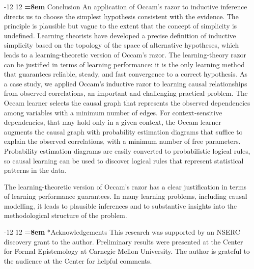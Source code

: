 \documentclass{elsarticle}%
\makeatletter
\renewcommand\section{\@startsection {section}{1}{\z@}%
  {-12\p@ \@plus -4\p@ \@minus -4\p@}%
                       {12\p@ \@plus 4\p@ \@minus 4\p@}%
                                   {\normalfont\large\bfseries\boldmath
                                   \rightskip=\z@ \@plus 8em\pretolerance=10000 }}
\makeatother
\begin{document}
\section{Conclusion}
An application of Occam’s razor to inductive inference directs us to choose the
simplest hypothesis consistent with the evidence. The principle is plausible but
vague to the extent that the concept of simplicity is undefined. Learning theorists
have developed a precise definition of inductive simplicity based on the topology
of the space of alternative hypotheses, which leads to a learning-theoretic version
of Occam's razor. The learning-theory razor can be justified in terms of learning performance:
it is the only learning method that guarantees reliable, steady, and fast convergence
to a correct hypothesis. As a case study, we applied Occam's inductive
razor to learning causal relationships from observed correlations, an important
and challenging practical problem. The Occam learner selects the causal graph
that represents the observed dependencies among variables with a minimum
number of edges. For context-sensitive dependencies, that may hold only in
a given context, the Occam learner augments the causal graph with probability
estimation diagrams that suffice to explain the observed correlations, with
a minimum number of free parameters. Probability estimation diagrams are
easily converted to probabilistic logical rules, so causal learning can be used to
discover logical rules that represent statistical patterns in the data.

The learning-theoretic version of Occam’s razor has a clear justification in
terms of learning performance guarantees. In many learning problems, including
causal modelling, it leads to plausible inferences and to substantive insights into
the methodological structure of the problem.

\section*{Acknowledgements}
This research was supported by an NSERC discovery grant to the author.
Preliminary results were presented at the Center for Formal Epistemology at
Carnegie Mellon University. The author is grateful to the audience at the Center
for helpful comments.
\end{document}
